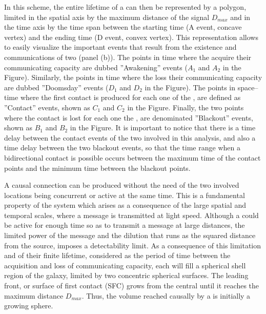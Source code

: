  

In this scheme, the entire lifetime of a \ceti{} can then be
represented by a polygon, limited in the spatial axis by the maximum
distance of the signal $D_{max}$ and in the time axis by the time span
between the starting time (A event, concave vertex) and the ending
time (D event, convex vertex).
%
This representation allows to easily visualize the important events
that result from the existence and communications of two \cetis{}
(panel (b)).
%
The points in time where the \cetis{} acquire their communicating
capacity are dubbed ''Awakening'' events ($A_1$ and $A_2$ in the
Figure).
%
Similarly, the points in time where the \cetis{} loss their
communicating capacity are dubbed ''Doomsday'' events ($D_1$ and $D_2$
in the Figure).
%
The points in space--time where the first contact is produced for each
one of the \cetis{}, are defined as ''Contact'' events, shown as $C_1$
and $C_2$ in the Figure.
%
Finally, the two points where the contact is lost for each one the
\cetis{}, are denominated ''Blackout'' events, shown as $B_1$ and
$B_2$ in the Figure.
%
It is important to notice that there is a time delay between the
contact events of the two \cetis{} involved in this analysis, and also
a time delay between the two blackout events, so that the time range
when a bidirectional contact is possible occurs between the maximum
time of the contact points and the minimum time between the blackout
points.   
 

A causal connection can be produced without the need of the two
involved locations being concurrent or active at the same time.
%
This is a fundamental property of the system which arises as a
consequence of the large spatial and temporal scales, where a message
is transmitted at light speed.
%
Although a \ceti{} could be active for enough time so as to transmit a
message at large distances, the limited power of the message and the
dilution that runs as the squared distance from the source, imposes a
detectability limit.
%
As a consequence of this limitation and of their finite lifetime,
considered as the period of time between the acquisition and loss of
communicating capacity, each \ceti{} will fill a spherical shell
region of the galaxy, limited by two concentric spherical surfaces.
%
The leading front, or surface of first contact (SFC) grows from the
central \ceti{} until it reaches the maximum distance $D_{max}$.
%
Thus, the volume reached causally by a \ceti{} is initially a growing
sphere.
   
      




